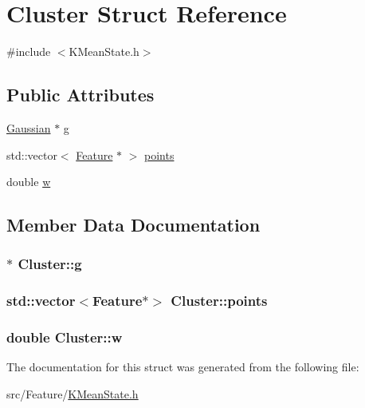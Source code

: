 \hypertarget{struct_cluster}{\section{Cluster Struct Reference}
\label{struct_cluster}
}


{\ttfamily \#include $<$K\+Mean\+State.\+h$>$}

\subsection*{Public Attributes}
\begin{DoxyCompactItemize}
\item 
\hyperlink{class_gaussian}{Gaussian} $\ast$ \hyperlink{struct_cluster_affaced9bc07c578318f59592d18c68b8}{g}
\item 
std\+::vector$<$ \hyperlink{class_feature}{Feature} $\ast$ $>$ \hyperlink{struct_cluster_aeffb52e9b39090a30dd621965ec577ae}{points}
\item 
double \hyperlink{struct_cluster_ab79e9b6fda34ac8768122889048304ba}{w}
\end{DoxyCompactItemize}


\subsection{Member Data Documentation}
\hypertarget{struct_cluster_affaced9bc07c578318f59592d18c68b8}{
\subsubsection[{g}]{$\ast$ Cluster\+::g}}\label{struct_cluster_affaced9bc07c578318f59592d18c68b8}
\hypertarget{struct_cluster_aeffb52e9b39090a30dd621965ec577ae}{
\subsubsection[{points}]{\setlength{\rightskip}{0pt plus 5cm}std\+::vector$<${\bf Feature}$\ast$$>$ Cluster\+::points}}\label{struct_cluster_aeffb52e9b39090a30dd621965ec577ae}
\hypertarget{struct_cluster_ab79e9b6fda34ac8768122889048304ba}{
\subsubsection[{w}]{\setlength{\rightskip}{0pt plus 5cm}double Cluster\+::w}}\label{struct_cluster_ab79e9b6fda34ac8768122889048304ba}


The documentation for this struct was generated from the following file\+:\begin{DoxyCompactItemize}
\item 
src/\+Feature/\hyperlink{_k_mean_state_8h}{K\+Mean\+State.\+h}\end{DoxyCompactItemize}
